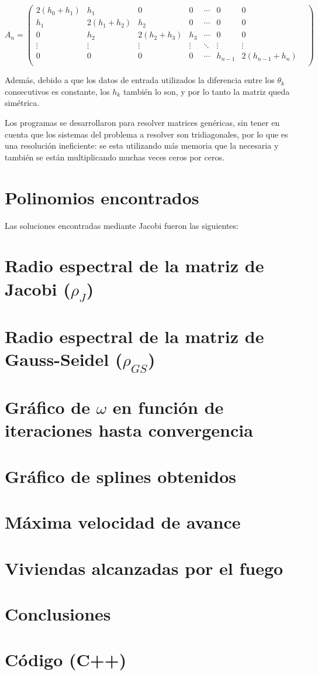 \documentclass[12pt,spanish]{article}
\begin{document}
\[
A_n=
  \begin{pmatrix}
   2(h_0+h_1) & h_1 & 0 &  0 & \cdots & 0 & 0 &\\
   h_1 & 2(h_1+h_2) & h_2 & 0 &  \cdots & 0 & 0 &\\
   0 & h_2 & 2(h_2+h_3) & h_3  &  \cdots & 0 & 0 &\\
   \vdots  & \vdots & \vdots & \vdots & \ddots & \vdots & \vdots &\\
   0 & 0 & 0 & 0 & \cdots & h_{n-1} & 2(h_{n-1}+h_n)\\
  \end{pmatrix}
\]

Además, debido a que los datos de entrada utilizados la diferencia entre los $\theta _k$ consecutivos es constante, los $h_k$ también lo son, y por lo tanto la matriz queda simétrica.

Los programas se desarrollaron para resolver matrices genéricas, sin tener en cuenta que los sistemas del problema a resolver son tridiagonales, por lo que es una resolución ineficiente: se esta utilizando más memoria que la necesaria y también se están multiplicando muchas veces ceros por ceros.

\section*{Polinomios encontrados}
Las soluciones encontradas mediante Jacobi fueron las siguientes:

\section*{Radio espectral de la matriz de Jacobi ($\rho_J$)}
\section*{Radio espectral de la matriz de Gauss-Seidel ($\rho_{GS}$)}
\section*{Gráfico de $\omega$ en función de iteraciones hasta convergencia}
\section*{Gráfico de splines obtenidos}
\section*{Máxima velocidad de avance}
\section*{Viviendas alcanzadas por el fuego}
\section*{Conclusiones}

\newpage
\section{Código (C++)}

\end{document}
